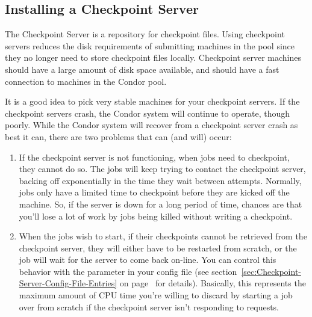 \subsection{\label{sec:Ckpt-Server}
Installing a Checkpoint Server}
The Checkpoint Server is a repository for checkpoint files.
Using checkpoint servers reduces the disk requirements of submitting
machines in the pool since they no longer need to store checkpoint
files locally.
Checkpoint server machines should have a large amount of disk space
available, and should have a fast connection to machines in the Condor
pool.

\Note It is a good idea to pick very stable machines for your checkpoint
servers.
If the checkpoint servers crash, the Condor system will continue to
operate, though poorly.  
While the Condor system will recover from a checkpoint server crash
as best it can, there are two problems that can (and will) occur:
\begin{enumerate}

\item If the checkpoint server is not functioning, when jobs need to
checkpoint, they cannot do so.
The jobs will keep trying to contact the checkpoint server, backing
off exponentially in the time they wait between attempts.
Normally, jobs only have a limited time to checkpoint before they are
kicked off the machine.
So, if the server is down for a long period of time, chances are that
you'll lose a lot of work by jobs being killed without writing a
checkpoint. 

\item When the jobs wish to start, if their checkpoints cannot be
retrieved from 
the checkpoint server, they will either have to be restarted from
scratch, or the job will wait for the server to come back on-line.
You can control this behavior with the
 parameter in your config file (see
section~\ref{sec:Checkpoint-Server-Config-File-Entries} on
page~\pageref{sec:Checkpoint-Server-Config-File-Entries} for details).
Basically, this represents the maximum amount of CPU time you're
willing to discard by starting a job over from scratch if the
checkpoint server isn't responding to requests.

\end{enumerate}

